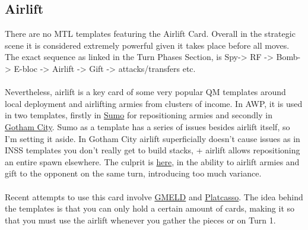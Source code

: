 \subsection{Airlift}

There are no MTL templates featuring the Airlift Card. Overall in the strategic scene it is considered extremely powerful given it takes place before all moves. The exact sequence as linked in the Turn Phases Section, is Spy-> RF -> Bomb-> E-bloc -> Airlift -> Gift -> attacks/transfers etc.
\\
\\
Nevertheless, airlift is a key card of some very popular QM templates around local deployment and airlifting armies from clusters of income. In AWP, it is used in two templates, firstly in \href{https://www.warzone.com/MultiPlayer/Tournament?ID=47456}{Sumo} for repositioning armies and secondly in \href{https://www.warzone.com/MultiPlayer/Tournament?ID=60562}{Gotham City}. Sumo as a template has a series of issues besides airlift itself, so I'm setting it aside. In Gotham City airlift superficially doesn't cause issues as in INSS templates you don't really get to build stacks, + airlift allows repositioning an entire spawn elsewhere. The culprit is \href{https://www.warzone.com/MultiPlayer?GameID=40937994}{here}, in the ability to airlift armies and gift to the opponent on the same turn, introducing too much variance.
\\
\\
Recent attempts to use this card involve \href{https://www.warzone.com/MultiPlayer/Tournament?ID=58382}{GMELD} and \href{https://www.warzone.com/MultiPlayer/Tournament?ID=61583}{Platcasso}. The idea behind the templates is that you can only hold a certain amount of cards, making it so that you must use the airlift whenever you gather the pieces or on Turn 1.